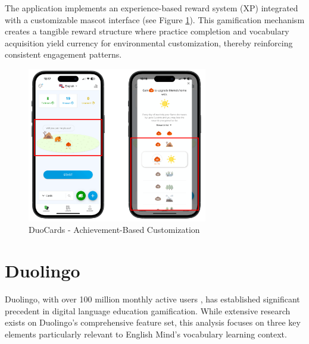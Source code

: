 \begin{itemize}
    The application implements an experience-based reward system (XP) integrated with a customizable mascot interface (see Figure \ref{fig:duocards-memo}). This gamification mechanism creates a tangible reward structure where practice completion and vocabulary acquisition yield currency for environmental customization, thereby reinforcing consistent engagement patterns.

    \begin{figure}[!h]
        \includegraphics[width=0.7\textwidth]{src/figures/duocards-memo.png}
        \caption{DuoCards - Achievement-Based Customization}
        \label{fig:duocards-memo}
    \end{figure}

\end{itemize}

\section{Duolingo}

Duolingo, with over 100 million monthly active users \cite{cite:duolingo_2024q2}, has established significant precedent in digital language education gamification. While extensive research exists on Duolingo's comprehensive feature set, this analysis focuses on three key elements particularly relevant to English Mind's vocabulary learning context.

